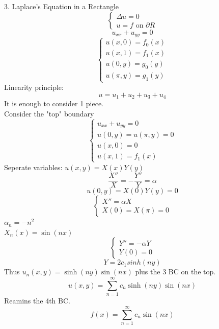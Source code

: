 \documentclass{article}
\begin{document}
3. Laplace's Equation in a Rectangle \\
$$\begin{cases}
    \Delta u = 0\\
    u = f \text{ on } \partial R
\end{cases}$$
$$ u_{xx} + u_{yy} = 0$$
$$\begin{cases}
    u(x,0) = f_0(x)\\
    u(x,1) = f_1(x)\\
    u(0,y) = g_0(y)\\
    u(\pi, y) = g_1(y)
\end{cases}$$
Linearity principle: \\
$$u = u_1 + u_2 + u_3 + u_4$$
It is enough to consider 1 piece.\\
Consider the "top" boundary
$$\begin{cases}
    u_{xx} + u_{yy} = 0\\
    u(0,y) = u(\pi,y) = 0\\
    u(x,0) = 0\\
    u(x,1) = f_1(x)
\end{cases}$$
Seperate variables: $u(x,y) = X(x)Y(y)$\\
$$\frac{X''}{X} = -\frac{Y''}{Y} = \alpha$$
$$ u(0,y) = X(0)Y(y) = 0$$
$$ \begin{cases}
    X'' = \alpha X\\
    X(0) = X(\pi) = 0
\end{cases}$$
$\alpha_n = -n^2$\\
$X_n(x) = \sin(nx)$\\
$$\begin{cases}
    Y'' = -\alpha Y\\
    Y(0) = 0
\end{cases}$$ 
$$Y = 2c_1 sinh(ny)$$ 
Thus $u_n(x,y) = \sinh(ny) \sin(nx)$ plus the 3 BC on the top.\\
$$u(x,y) = \sum_{n=1}^{\infty} c_n \sinh(ny) \sin(nx)$$
Reamins the 4th BC.\\
$$f(x) = \sum_{n=1}^{\infty} c_n \sin(nx)$$
\end{document}
